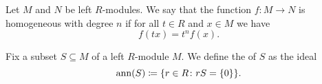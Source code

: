 \begin{definition}\label{def:homogenous_function}
  Let \( M \) and \( N \) be left \( R \)-modules. We say that the function \( f: M \to N \) is homogeneous with degree \( n \) if for all \( t \in R \) and \( x \in M \) we have
  \begin{equation*}
    f(t x) = t^n f(x).
  \end{equation*}
\end{definition}

\begin{definition}\label{def:left_module_annihilator}\cite[30]{Коцев2016}
  Fix a subset \( S \subseteq M \) of a left \( R \)-module \( M \). We define the  of \( S \) as the ideal
  \begin{equation*}
    \operatorname{ann}(S) \coloneqq \{ r \in R \colon rS = \{ 0 \} \}.
  \end{equation*}
\end{definition}
